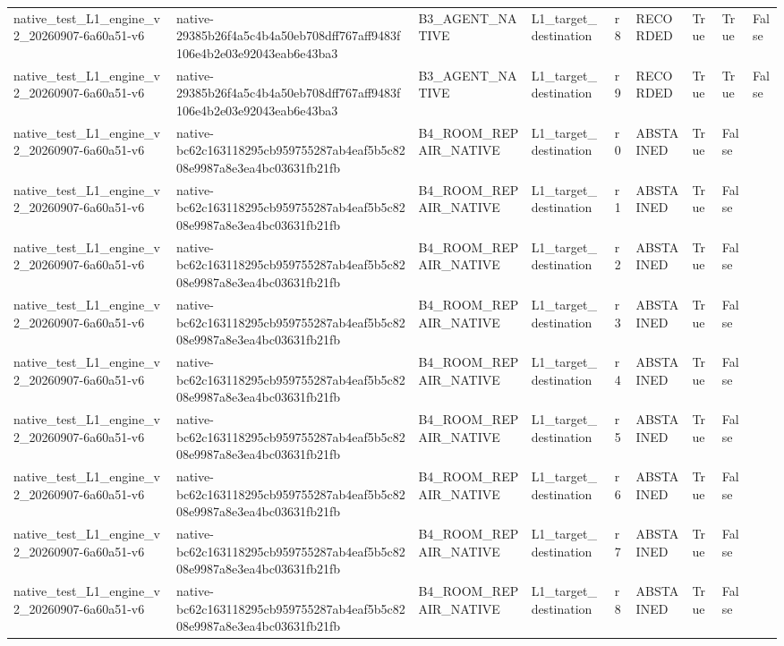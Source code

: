 \begin{tabular}{lllllllll}
native\_test\_L1\_engine\_v2\_20260907-6a60a51-v6 & native-29385b26f4a5c4b4a50eb708dff767aff9483f106e4b2e03e92043eab6e43ba3 & B3\_AGENT\_NATIVE & L1\_target\_destination & r8 & RECORDED & True & True & False \\
native\_test\_L1\_engine\_v2\_20260907-6a60a51-v6 & native-29385b26f4a5c4b4a50eb708dff767aff9483f106e4b2e03e92043eab6e43ba3 & B3\_AGENT\_NATIVE & L1\_target\_destination & r9 & RECORDED & True & True & False \\
native\_test\_L1\_engine\_v2\_20260907-6a60a51-v6 & native-bc62c163118295cb959755287ab4eaf5b5c8208e9987a8e3ea4bc03631fb21fb & B4\_ROOM\_REPAIR\_NATIVE & L1\_target\_destination & r0 & ABSTAINED & True & False &  \\
native\_test\_L1\_engine\_v2\_20260907-6a60a51-v6 & native-bc62c163118295cb959755287ab4eaf5b5c8208e9987a8e3ea4bc03631fb21fb & B4\_ROOM\_REPAIR\_NATIVE & L1\_target\_destination & r1 & ABSTAINED & True & False &  \\
native\_test\_L1\_engine\_v2\_20260907-6a60a51-v6 & native-bc62c163118295cb959755287ab4eaf5b5c8208e9987a8e3ea4bc03631fb21fb & B4\_ROOM\_REPAIR\_NATIVE & L1\_target\_destination & r2 & ABSTAINED & True & False &  \\
native\_test\_L1\_engine\_v2\_20260907-6a60a51-v6 & native-bc62c163118295cb959755287ab4eaf5b5c8208e9987a8e3ea4bc03631fb21fb & B4\_ROOM\_REPAIR\_NATIVE & L1\_target\_destination & r3 & ABSTAINED & True & False &  \\
native\_test\_L1\_engine\_v2\_20260907-6a60a51-v6 & native-bc62c163118295cb959755287ab4eaf5b5c8208e9987a8e3ea4bc03631fb21fb & B4\_ROOM\_REPAIR\_NATIVE & L1\_target\_destination & r4 & ABSTAINED & True & False &  \\
native\_test\_L1\_engine\_v2\_20260907-6a60a51-v6 & native-bc62c163118295cb959755287ab4eaf5b5c8208e9987a8e3ea4bc03631fb21fb & B4\_ROOM\_REPAIR\_NATIVE & L1\_target\_destination & r5 & ABSTAINED & True & False &  \\
native\_test\_L1\_engine\_v2\_20260907-6a60a51-v6 & native-bc62c163118295cb959755287ab4eaf5b5c8208e9987a8e3ea4bc03631fb21fb & B4\_ROOM\_REPAIR\_NATIVE & L1\_target\_destination & r6 & ABSTAINED & True & False &  \\
native\_test\_L1\_engine\_v2\_20260907-6a60a51-v6 & native-bc62c163118295cb959755287ab4eaf5b5c8208e9987a8e3ea4bc03631fb21fb & B4\_ROOM\_REPAIR\_NATIVE & L1\_target\_destination & r7 & ABSTAINED & True & False &  \\
native\_test\_L1\_engine\_v2\_20260907-6a60a51-v6 & native-bc62c163118295cb959755287ab4eaf5b5c8208e9987a8e3ea4bc03631fb21fb & B4\_ROOM\_REPAIR\_NATIVE & L1\_target\_destination & r8 & ABSTAINED & True & False &  \\

\end{tabular}
